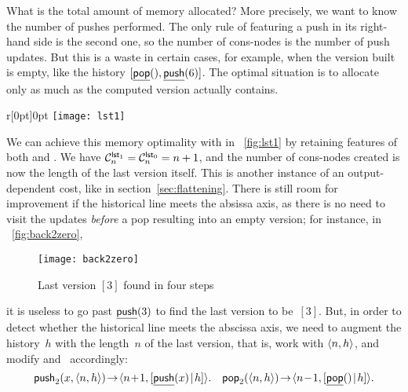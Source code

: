 What is the total amount of memory
allocated? More precisely,
we want to know the number of pushes performed. The only rule of
 featuring a push in its right\hyp{}hand side is the
second one, so the number of cons\hyp{}nodes is the number of push
updates. But this is a waste in certain cases, for example, when the
version built is empty, like the history
\([\ufun{pop}(),\ufun{push}(6)]\). The optimal situation is to
allocate only as much as the computed version actually contains.

%
\setlength{\intextsep}{0pt}
\begin{wrapfigure}[]{r}[0pt]{0pt}
\centering
\texttt{[image: lst1]}
\caption{Last version \label{fig:lst1}}
\end{wrapfigure}
\hspace*{-5.6pt} We can achieve this memory optimality with
 in \fig~\ref{fig:lst1} by retaining features of both
 and .
We have \(\C{\fun{lst}_1}{n} =
\C{\fun{lst}_0}{n} = n + 1\), and the number of
cons\hyp{}nodes created is now the length of the last
version itself. This is another instance of an output\hyp{}dependent
cost, like
 in
section~\vref{sec:flattening}. There is still room for improvement if
the historical line meets the absissa axis, as there is no need to
visit the updates \emph{before} a pop resulting into an empty version;
for instance, in \fig~\vref{fig:back2zero},
\begin{figure}[b]
\centering
\texttt{[image: back2zero]}
\caption{Last version $[3]$ found in four steps\label{fig:back2zero}}
\end{figure}
it is useless to go past \(\ufun{push}(3)\)
to find the last version to be~\([3]\). But, in order to detect
whether the historical line meets the abscissa axis, we need to
augment the history~\(h\) with the length~\(n\) of the last version,
that is, work with \(\pair{n}{h}\), and modify
and~ accordingly:
\begin{equation*}
\fun{push}_2(x,\pair{n}{h}) \! \rightarrow \!
\pair{n\!+\!1}{\cons{\ufun{push}(x)}{h}}.\quad
\fun{pop}_2(\pair{n}{h}) \! \rightarrow \!
\pair{n\!-\!1}{\cons{\ufun{pop}()}{h}}.
\end{equation*}
